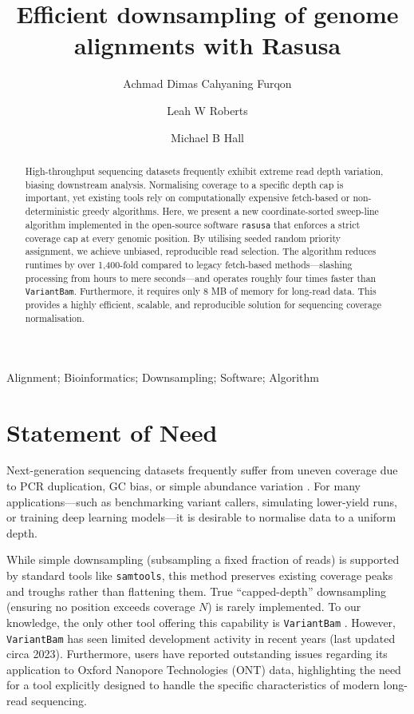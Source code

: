 \documentclass[a4paper,num-refs,gigabyte]{oup-contemporary}
\title{Efficient downsampling of genome alignments with Rasusa}
\author[1]{Achmad Dimas Cahyaning Furqon}
\author[1]{Leah W Roberts}
\author[1,\authfn{1}]{Michael B Hall}
\affil[1]{The University of Queensland, UQ Centre for Clinical Research, Herston, QLD 4029, Australia}
\begin{document}
\begin{frontmatter}
\maketitle
\begin{abstract}
High-throughput sequencing datasets frequently exhibit extreme read depth variation, biasing downstream analysis. Normalising coverage to a specific depth cap is important, yet existing tools rely on computationally expensive fetch-based or non-deterministic greedy algorithms. Here, we present a new coordinate-sorted sweep-line algorithm implemented in the open-source software \texttt{rasusa} that enforces a strict coverage cap at every genomic position. By utilising seeded random priority assignment, we achieve unbiased, reproducible read selection. The algorithm reduces runtimes by over 1,400-fold compared to legacy fetch-based methods---slashing processing from hours to mere seconds---and operates roughly four times faster than \texttt{VariantBam}. Furthermore, it requires only 8 MB of memory for long-read data. This provides a highly efficient, scalable, and reproducible solution for sequencing coverage normalisation.
\end{abstract}

\begin{keywords}
Alignment; Bioinformatics; Downsampling; Software; Algorithm
\end{keywords}
\end{frontmatter}
    
\section{Statement of Need}
\label{sec:background}

Next-generation sequencing datasets frequently suffer from uneven coverage due to PCR duplication, GC bias, or simple abundance variation \citep{chen_effects_2013}. For many applications---such as benchmarking variant callers, simulating lower-yield runs, or training deep learning models---it is desirable to normalise data to a uniform depth.

While simple downsampling (subsampling a fixed fraction of reads) is supported by standard tools like \texttt{samtools}, this method preserves existing coverage peaks and troughs rather than flattening them. True ``capped-depth'' downsampling (ensuring no position exceeds coverage $N$) is rarely implemented. To our knowledge, the only other tool offering this capability is \texttt{VariantBam} \cite{wala_variantbam_2016}. However, \texttt{VariantBam} has seen limited development activity in recent years (last updated circa 2023). Furthermore, users have reported outstanding issues regarding its application to Oxford Nanopore Technologies (ONT) data, highlighting the need for a tool explicitly designed to handle the specific characteristics of modern long-read sequencing.
\end{document}
